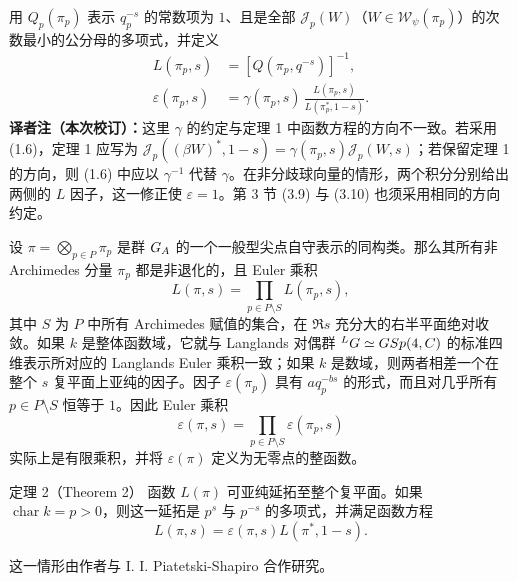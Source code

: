 用 $Q_p(\pi_p)$ 表示 $q_p^{-s}$ 的常数项为 $1$、且是全部 $\mathcal J_p(W)$（$W\in\mathcal W_\psi(\pi_p)$）的次数最小的公分母的多项式，并定义
\begin{equation}
 \begin{aligned}
 L(\pi_p,s)&=[Q(\pi_p,q^{-s})]^{-1},\\
 \varepsilon(\pi_p,s)&=\gamma(\pi_p,s)\,
 \frac{L(\pi_p,s)}{L(\pi_p^*,1-s)}.
 \end{aligned}
 \tag{1.6}
\end{equation}
\noindent\footnotesize\textbf{译者注（本次校订）：}这里 $\gamma$ 的约定与定理 1 中函数方程的方向不一致。若采用 (1.6)，定理 1 应写为 $\mathcal J_p((\beta W)^*,1-s)=\gamma(\pi_p,s)\mathcal J_p(W,s)$；若保留定理 1 的方向，则 (1.6) 中应以 $\gamma^{-1}$ 代替 $\gamma$。在非分歧球向量的情形，两个积分分别给出两侧的 $L$ 因子，这一修正使 $\varepsilon=1$。第 3 节 (3.9) 与 (3.10) 也须采用相同的方向约定。\normalsize

设 $\pi=\bigotimes_{p\in P}\pi_p$ 是群 $G_A$ 的一个一般型尖点自守表示的同构类。那么其所有非 Archimedes 分量 $\pi_p$ 都是非退化的，且 Euler 乘积
\begin{equation}
 L(\pi,s)=\prod_{p\in P\setminus S}L(\pi_p,s),
 \tag{1.7}
\end{equation}
其中 $S$ 为 $P$ 中所有 Archimedes 赋值的集合，在 $\Re s$ 充分大的右半平面绝对收敛。如果 $k$ 是整体函数域，它就与 Langlands 对偶群 ${}^LG\simeq GSp(4,C)$ 的标准四维表示所对应的 Langlands Euler 乘积一致；如果 $k$ 是数域，则两者相差一个在整个 $s$ 复平面上亚纯的因子。因子 $\varepsilon(\pi_p)$ 具有 $aq_p^{-bs}$ 的形式，而且对几乎所有 $p\in P\setminus S$ 恒等于 $1$。因此 Euler 乘积
\begin{equation}
 \varepsilon(\pi,s)=\prod_{p\in P\setminus S}\varepsilon(\pi_p,s)
 \tag{1.8}
\end{equation}
实际上是有限乘积，并将 $\varepsilon(\pi)$ 定义为无零点的整函数。

\begin{originaltheorem}{定理 2（Theorem 2）}
函数 $L(\pi)$ 可亚纯延拓至整个复平面。如果 $\operatorname{char}k=p>0$，则这一延拓是 $p^s$ 与 $p^{-s}$ 的多项式，并满足函数方程
\begin{equation}
 L(\pi,s)=\varepsilon(\pi,s)L(\pi^*,1-s).
 \tag{1.8}
\end{equation}
\end{originaltheorem}

这一情形由作者与 I. I. Piatetski-Shapiro 合作研究。

